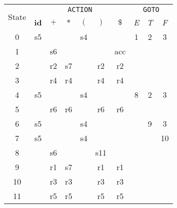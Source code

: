 \documentclass[border=0.8ex,varwidth]{standalone}
\begin{document}
\begin{table}
  \begin{tabular}{cccccccccc}
    \toprule
    \multirow{2}{*}{State} & \multicolumn{6}{c}{\texttt{ACTION}} &
                                                                  \multicolumn{3}{c}{\texttt{GOTO}}\\
    \cline{2-10}
                          & \textbf{id} & \(+\) & \(*\) & \((\) & \()\) & \(\$\)
                                                                & \textit{E} &
                                                                               \textit{T} & \textit{F} \\
    \midrule
    0 & s5 & & & s4 & & & 1 & 2 & 3\\
    1 & & s6 & & & & acc & & & \\
    2 & & r2 & s7 & & r2 & r2 & & & \\
    3 & & r4 & r4 & & r4 & r4 & & & \\
    4 & s5 & & & s4 & & & 8 & 2 & 3\\
    5 & & r6 & r6 & & r6 & r6 & & & \\
    6 & s5 & & & s4 & & & & 9 & 3\\
    7 & s5 & & & s4 & & & & & 10\\
    8 & & s6 & & & s11 & & & & \\
    9 & & r1 & s7 & & r1 & r1 & & & \\
    10 & & r3 & r3 & & r3 & r3 & & & \\
    11 & & r5 & r5 & & r5 & r5 & & & \\
    \bottomrule
  \end{tabular}
\end{table}
\end{document}
